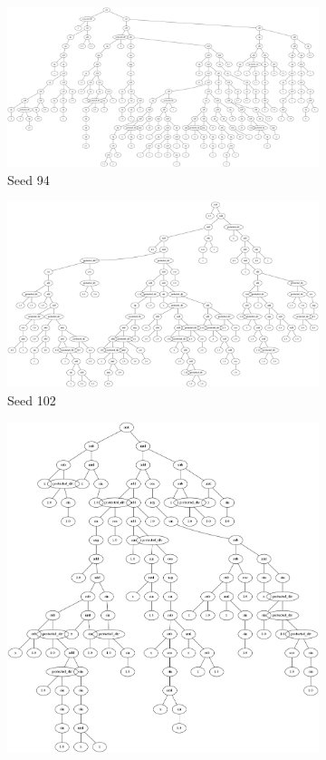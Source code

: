 \documentclass{article}
\begin{document}
\begin{figure}[h!]
	\begin{subfigure}[b]{0.49\linewidth}
		\includegraphics[width=\linewidth]{tree94.png}
		\caption{Seed 94}
	\end{subfigure}
	\begin{subfigure}[b]{0.49\linewidth}
		\includegraphics[width=\linewidth]{tree102.png}
		\caption{Seed 102}
	\end{subfigure}
	\begin{subfigure}[b]{0.49\linewidth}
		\includegraphics[width=\linewidth]{tree151.png}

\end{subfigure}
\end{figure}
\end{document}
